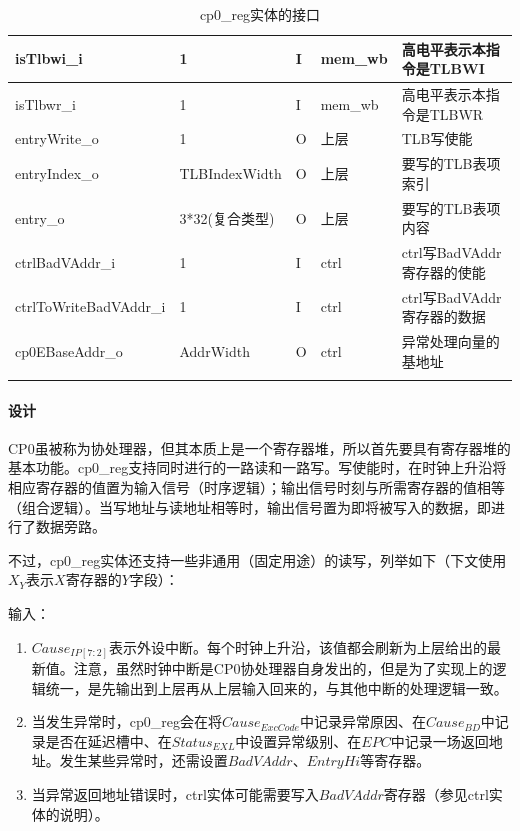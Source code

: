 \documentclass{article}
\begin{document}
\begin{spacing}{1.4}
\begin{longtable}{l|l|l|l|p{5cm}}
\hline isTlbwi\_i              & 1                      & I     & mem\_wb       & 高电平表示本指令是TLBWI \\
\hline isTlbwr\_i              & 1                      & I     & mem\_wb       & 高电平表示本指令是TLBWR \\
\hline entryWrite\_o           & 1                      & O     & 上层          & TLB写使能 \\
\hline entryIndex\_o           & TLBIndexWidth          & O     & 上层          & 要写的TLB表项索引 \\
\hline entry\_o                & 3*32(复合类型)         & O     & 上层          & 要写的TLB表项内容 \\
\hline ctrlBadVAddr\_i         & 1                      & I     & ctrl          & ctrl写BadVAddr寄存器的使能 \\
\hline ctrlToWriteBadVAddr\_i  & 1                      & I     & ctrl          & ctrl写BadVAddr寄存器的数据 \\
\hline cp0EBaseAddr\_o         & AddrWidth              & O     & ctrl          & 异常处理向量的基地址 \\
\hline
\caption{cp0\_reg实体的接口}
\label{tb:cp0reg-interface}
\end{longtable}

\paragraph{设计}\mbox{}

CP0虽被称为协处理器，但其本质上是一个寄存器堆，所以首先要具有寄存器堆的基本功能。cp0\_reg支持同时进行的一路读和一路写。写使能时，在时钟上升沿将相应寄存器的值置为输入信号（时序逻辑）；输出信号时刻与所需寄存器的值相等（组合逻辑）。当写地址与读地址相等时，输出信号置为即将被写入的数据，即进行了数据旁路。

不过，cp0\_reg实体还支持一些非通用（固定用途）的读写，列举如下（下文使用$X_Y$表示$X$寄存器的$Y$字段）：

输入：

\begin{enumerate}
    \item $Cause_{IP[7:2]}$表示外设中断。每个时钟上升沿，该值都会刷新为上层给出的最新值。注意，虽然时钟中断是CP0协处理器自身发出的，但是为了实现上的逻辑统一，是先输出到上层再从上层输入回来的，与其他中断的处理逻辑一致。
    \item 当发生异常时，cp0\_reg会在将$Cause_{ExcCode}$中记录异常原因、在$Cause_{BD}$中记录是否在延迟槽中、在$Status_{EXL}$中设置异常级别、在$EPC$中记录一场返回地址。发生某些异常时，还需设置$BadVAddr$、$EntryHi$等寄存器。
    \item 当异常返回地址错误时，ctrl实体可能需要写入$BadVAddr$寄存器（参见ctrl实体的说明）。
\end{enumerate}


\end{spacing}
\end{document}
